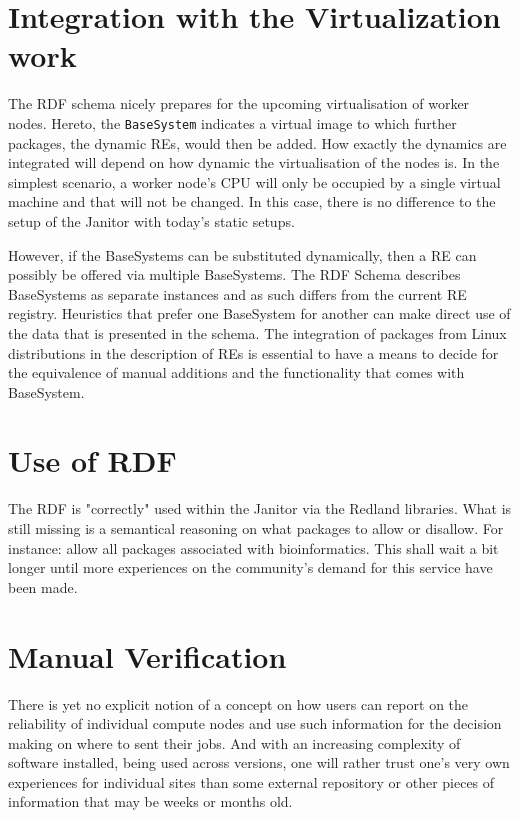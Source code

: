\section{Integration with the Virtualization work}

The RDF schema nicely prepares for the upcoming virtualisation of worker
nodes. Hereto, the {\tt BaseSystem} indicates a virtual image to which
further packages, the dynamic REs, would then be added.
How exactly the dynamics are integrated will depend on how
dynamic the virtualisation of the nodes is. In the simplest scenario,
a worker node's CPU will only be occupied by a single virtual machine
and that will not be changed. In this case, there is no difference to
the setup of the Janitor with today's static setups.

However, if the BaseSystems can be substituted dynamically, then a RE
can possibly be offered via multiple BaseSystems. The RDF
Schema describes BaseSystems as separate instances and as such differs
from the current RE registry.  Heuristics that prefer one BaseSystem for
another can make direct use of the data that is presented in the schema.
The integration of packages from Linux distributions in the description
of REs is essential to have a means to decide for the equivalence of
manual additions and the functionality that comes with BaseSystem.


\section{Use of RDF}

The RDF is "correctly" used within the Janitor via the Redland libraries.
What is still missing is a semantical reasoning on what packages to
allow or disallow. For instance: allow all packages associated with
bioinformatics. This shall wait a bit longer until more experiences
on the community's demand for this service have been made.

\section{Manual Verification}

There is yet no explicit notion of a concept on how users can report
on the reliability of individual compute nodes and use such information
for the decision making on where to sent their jobs. And with an increasing
complexity of software installed, being used across versions, one will
rather trust one's very own experiences for individual sites than some
external repository or other pieces of information that may be weeks
or months old.

